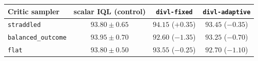 \begin{tabular}{lccc}
\hline
Critic sampler & scalar IQL (control) & \texttt{divl-fixed} & \texttt{divl-adaptive} \\
\hline
\texttt{straddled} & $93.80 \pm 0.65$ & $94.15$ ($+0.35$) & $93.45$ ($-0.35$) \\
\texttt{balanced\_outcome} & $93.95 \pm 0.70$ & $92.60$ ($-1.35$) & $93.25$ ($-0.70$) \\
\texttt{flat} & $93.80 \pm 0.50$ & $93.55$ ($-0.25$) & $92.70$ ($-1.10$) \\
\hline
\end{tabular}
